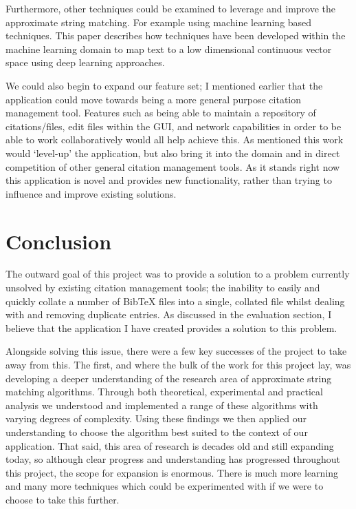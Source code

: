 \documentclass[a4paper,11pt]{article}
\begin{document}
Furthermore, other techniques could be examined to leverage and improve the approximate string matching. For example using machine learning based techniques. This paper \citep{mlStringMatching} describes how techniques have been developed within the machine learning domain to map text to a low dimensional continuous vector space using deep learning approaches.

We could also begin to expand our feature set; I mentioned earlier that the application could move towards being a more general purpose citation management tool. Features such as being able to maintain a repository of citations/files, edit files within the GUI, and network capabilities in order to be able to work collaboratively would all help achieve this. As mentioned this work would `level-up' the application, but also bring it into the domain and in direct competition of other general citation management tools. As it stands right now this application is novel and provides new functionality, rather than trying to influence and improve existing solutions.

\section{Conclusion}
The outward goal of this project was to provide a solution to a problem currently unsolved by existing citation management tools; the inability to easily and quickly collate a number of BibTeX files into a single, collated file whilst dealing with and removing duplicate entries. As discussed in the evaluation section, I believe that the application I have created provides a solution to this problem.

Alongside solving this issue, there were a few key successes of the project to take away from this. The first, and where the bulk of the work for this project lay, was developing a deeper understanding of the research area of approximate string matching algorithms. Through both theoretical, experimental and practical analysis we understood and implemented a range of these algorithms with varying degrees of complexity. Using these findings we then applied our understanding to choose the algorithm best suited to the context of our application. That said, this area of research is decades old and still expanding today, so although clear progress and understanding has progressed throughout this project, the scope for expansion is enormous. There is much more learning and many more techniques which could be experimented with if we were to choose to take this further.
\end{document}
